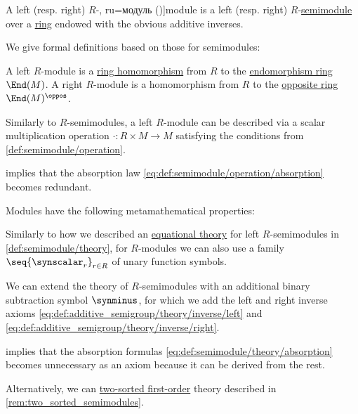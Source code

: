 \begin{definition}\label{def:module}
  A left (resp. right) \( R \)-\term[bg=модул (\cite[27]{КоцевСидеров2016КомутативнаАлгебра}, ru=модуль (\cite[def. 9.3.1]{Винберг2014КурсАлгебры})]{module} is a left (resp. right) \( R \)-\hyperref[def:semimodule]{semimodule} over a \hyperref[def:ring]{ring} endowed with the obvious additive inverses.

  We give formal definitions based on those for semimodules:
  \begin{thmenum}[series=def:module]
     A left \( R \)-module is a \hyperref[def:ring/morphism]{ring homomorphism} from \( R \) to the \hyperref[def:endomorphism_ring]{endomorphism ring} \( \End(M) \). A right \( R \)-module is a homomorphism from \( R \) to the \hyperref[def:semiring/opposite]{opposite ring} \( \End(M)^\oppos \).

     Similarly to \( R \)-semimodules, a left \( R \)-module can be described via a scalar multiplication operation \( \cdot: R \times M \to M \) satisfying the conditions from \cref{def:semimodule/operation}.

     implies that the absorption law \eqref{eq:def:semimodule/operation/absorption} becomes redundant.
  \end{thmenum}

  Modules have the following metamathematical properties:
  \begin{thmenum}
     Similarly to how we described an \hyperref[def:fol_equational_theory]{equational theory} for left \( R \)-semimodules in \cref{def:semimodule/theory}, for \( R \)-modules we can also use a family \( \seq{ \synscalar_r }_{r \in R} \) of unary function symbols.

    We can extend the theory of \( R \)-semimodules with an additional binary subtraction symbol \( \synminus \), for which we add the left and right inverse axioms \eqref{eq:def:additive_semigroup/theory/inverse/left} and \eqref{eq:def:additive_semigroup/theory/inverse/right}.

     implies that the absorption formulas \eqref{eq:def:semimodule/theory/absorption} becomes unnecessary as an axiom because it can be derived from the rest.

    Alternatively, we can \hyperref[def:many_sorted_fol]{two-sorted first-order} theory described in \cref{rem:two_sorted_semimodules}.


\end{thmenum}
\end{definition}
